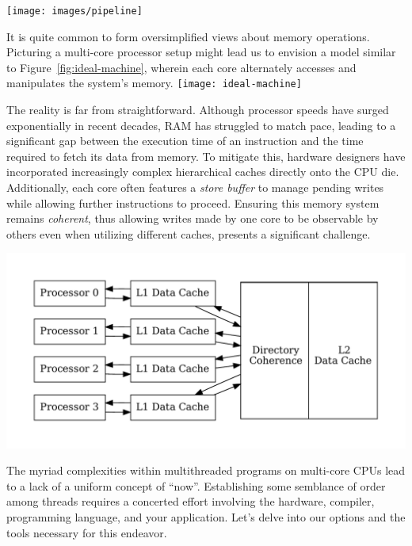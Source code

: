 \documentclass[fontsize=10pt, oneside]{scrartcl}
\newcommand{\fig}[1]{Figure~\ref{#1}}
\newcommand{\introduce}[1]{\textit{#1}}
\begin{document}
\texttt{[image: images/pipeline]}
\label{fig:pipeline}

It is quite common to form oversimplified views about memory operations.
Picturing a multi-core processor setup might lead us to envision a model similar to \fig{fig:ideal-machine},
wherein each core alternately accesses and manipulates the system's memory.
\texttt{[image: ideal-machine]}
\label{fig:ideal-machine}

The reality is far from straightforward.
Although processor speeds have surged exponentially in recent decades,
\textsc{RAM} has struggled to match pace,
leading to a significant gap between the execution time of an instruction and the time required to fetch its data from memory.
To mitigate this, hardware designers have incorporated increasingly complex hierarchical caches directly onto the \textsc{CPU} die.
Additionally, each core often features a \introduce{store buffer} to manage pending writes while allowing further instructions to proceed.
Ensuring this memory system remains \introduce{coherent},
thus allowing writes made by one core to be observable by others even when utilizing different caches,
presents a significant challenge.

\includegraphics[keepaspectratio, width=0.8\linewidth]{images/mp-cache}
\label{fig:dunnington}

The myriad complexities within multithreaded programs on multi-core \textsc{CPU}s lead to a lack of a uniform concept of ``now''.
Establishing some semblance of order among threads requires a concerted effort involving the hardware,
compiler, programming language, and your application.
Let's delve into our options and the tools necessary for this endeavor.
\end{document}
